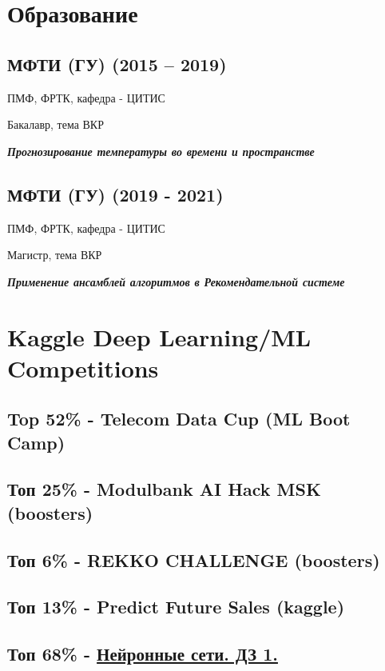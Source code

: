 \documentclass[11pt]{article}
\begin{document}
\section{Образование}
\label{sec:orgd8b621d}
\subsection{МФТИ (ГУ) (2015 – 2019)}
\label{sec:org98bd6ea}
ПМФ, ФРТК, кафедра - ЦИТИС

Бакалавр, тема ВКР

\begin{center}
\textbf{\emph{Прогнозирование температуры во времени и пространстве}}
\end{center}
\subsection{МФТИ (ГУ) (2019 - 2021)}
\label{sec:orge11a6a3}
ПМФ, ФРТК, кафедра - ЦИТИС

Магистр, тема ВКР
\begin{center}
\textbf{\emph{Применение ансамблей алгоритмов в Рекомендательной системе}}
\end{center}

\section{Kaggle Deep Learning/ML Competitions}
\label{sec:orgaa557bb}
\subsection{Top 52\% - Telecom Data Cup (ML Boot Camp)}
\label{sec:org617fa4e}
\subsection{Топ 25\% - Modulbank AI Hack MSK (boosters)}
\label{sec:org7d521a5}
\subsection{Топ 6\% - REKKO CHALLENGE (boosters)}
\label{sec:org367f4fd}
\subsection{Топ 13\% - Predict Future Sales (kaggle)}
\label{sec:org40ceaad}
\subsection{Топ 68\% - \href{https://www.kaggle.com/c/2019s-neuralnet-track}{Нейронные сети. ДЗ 1.}}
\label{sec:orgb4ed52d}
\end{document}
